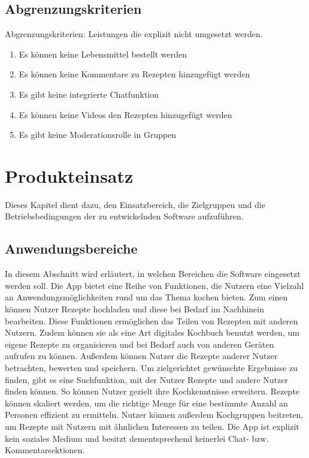 \documentclass[parskip=full]{scrartcl}
\begin{document}
\subsection{Abgrenzungskriterien}
Abgrenzungskriterien: Leistungen die explizit nicht umgesetzt werden.

\begin{enumerate}[start=1,label={$\langle$\bfseries RW\arabic*$\rangle$}, leftmargin = 5em, itemsep=4pt, parsep=4pt]
    \item Es können keine Lebensmittel bestellt werden
    \item Es können keine Kommentare zu Rezepten hinzugefügt werden
    \item Es gibt keine integrierte Chatfunktion
    \item Es können keine Videos den Rezepten hinzugefügt werden
    \item Es gibt keine Moderationsrolle in Gruppen
\end{enumerate}

\section{Produkteinsatz}
Dieses Kapitel dient dazu, den Einsatzbereich, die Zielgruppen und die Betriebsbedingungen der zu entwickelnden Software aufzuführen.

\subsection{Anwendungsbereiche}
In diesem Abschnitt wird erläutert, in welchen Bereichen die Software eingesetzt werden soll.
Die App bietet eine Reihe von Funktionen, die Nutzern eine Vielzahl an Anwendungsmöglichkeiten rund um das Thema kochen bieten. 
Zum einen können Nutzer Rezepte hochladen und diese bei Bedarf im Nachhinein bearbeiten. 
Diese Funktionen ermöglichen das Teilen von Rezepten mit anderen Nutzern. 
Zudem können sie als eine Art digitales Kochbuch benutzt werden, um eigene Rezepte zu organisieren und bei Bedarf auch von anderen Geräten aufrufen zu können. 
Außerdem können Nutzer die Rezepte anderer Nutzer betrachten, bewerten und speichern. 
Um zielgerichtet gewünschte Ergebnisse zu finden, gibt es eine Suchfunktion, mit der Nutzer Rezepte und andere Nutzer finden können. 
So können Nutzer gezielt ihre Kochkenntnisse erweitern. 
Rezepte können skaliert werden, um die richtige Menge für eine bestimmte Anzahl an Personen effizient zu ermitteln. 
Nutzer können außerdem Kochgruppen beitreten, um Rezepte mit Nutzern mit ähnlichen Interessen zu teilen. 
Die App ist explizit kein soziales Medium und besitzt dementsprechend keinerlei Chat- bzw. Kommentarsektionen.
\end{document}
